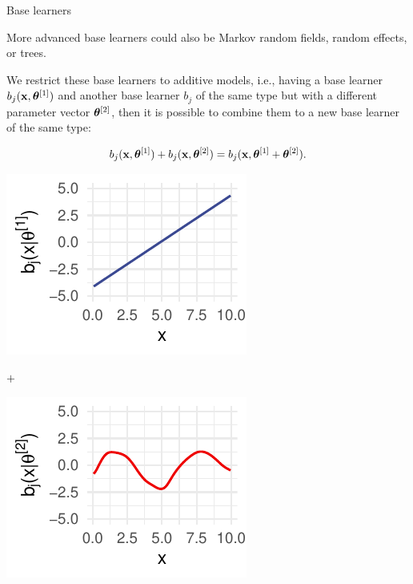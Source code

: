 \documentclass[11pt,compress,t,notes=noshow, xcolor=table]{beamer}
\begin{document}
\begin{vbframe}{Base learners}
\vspace{\baselineskip}

More advanced base learners could also be  Markov random fields, random effects, or trees.

\framebreak

We restrict these base learners to additive models, i.e., having a base learner $ b_j(\mathbf{x}, \bm{\theta}^{[1]})$ and another base learner $b_j$ of the same type but with a different parameter vector $\bm{\theta}^{[2]}$, then it is possible to combine them to a new base learner of the same type:

$$
 b_j(\mathbf{x}, \bm{\theta}^{[1]}) + b_j(\mathbf{x}, \bm{\theta}^{[2]}) =
 b_j(\mathbf{x}, \bm{\theta}^{[1]} + \bm{\theta}^{[2]}).
$$
\begin{center}
\begin{minipage}{.25\linewidth}
\includegraphics{figure/boosting-cwb-bl-add1.pdf}
\end{minipage}
\begin{minipage}{.05\linewidth}
\vspace*{-0.3cm}
$\bm{+}$
\end{minipage}
\begin{minipage}{.25\linewidth}
\includegraphics{figure/boosting-cwb-bl-add2.pdf} 
\end{minipage}
\begin{minipage}{.05\linewidth}
\vspace*{-0.3cm}

\end{minipage}
\end{center}
\end{vbframe}
\end{document}
